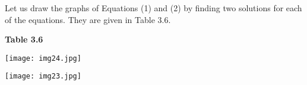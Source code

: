 \documentclass{article}
\begin{document}
\noindent
Let us draw the graphs of Equations (1) and (2) by finding two solutions for each of the equations. They are given in Table 3.6.
\vspace{0.5cm}
\begin{center}
\textbf{\textcolor{ncertcyan}{Table 3.6}}
\end{center}

\begin{minipage}{0.45\textwidth}
    \texttt{[image: img24.jpg]}
\end{minipage}
\hspace{0.05\textwidth}
\begin{minipage}{0.45\textwidth}
    \texttt{[image: img23.jpg]} 
\end{minipage}
\end{document}
